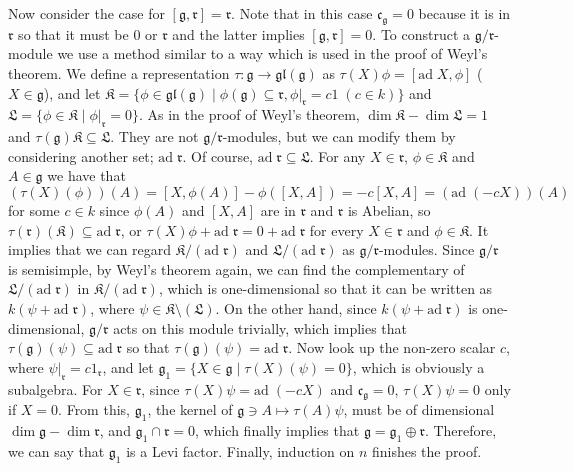 \documentclass{article}
\newcommand{\SBar}{\;|\;}
\newcommand{\lie}[1]{\mathfrak{#1}}
\newcommand{\ad}[1]{\mathrm{ad}\; #1}
\begin{document}
Now consider the case for $[\lie{g}, \lie{r}] = \lie{r}$.
Note that in this case $\lie{c}_\lie{g} = 0$ because it is in $\lie{r}$ so that it must be $0$ or $\lie{r}$ and the latter implies $[\lie{g}, \lie{r}] = 0$.
To construct a $\lie{g}/\lie{r}$-module we use a method similar to a way which is used in the proof of Weyl's theorem.
We define a representation $\tau : \lie{g} \to \lie{gl}(\lie{g})$ as $\tau(X) \phi = [\ad{X}, \phi]$ ($X \in \lie{g}$), and let $\lie{K} = \{\phi \in \lie{gl}(\lie{g}) \SBar \phi(\lie{g}) \subseteq \lie{r}, \phi|_{\lie{r}} = c1 \; (c \in k)\}$ and $\lie{L} = \{\phi \in \lie{K} \SBar \phi|_\lie{r} = 0\}$.
As in the proof of Weyl's theorem, $\dim{\lie{K}} - \dim{\lie{L}} = 1$ and $\tau(\lie{g}) \lie{K} \subseteq \lie{L}$.
They are not $\lie{g}/\lie{r}$-modules, but we can modify them by considering another set; $\ad{\lie{r}}$.
Of course, $\ad{\lie{r}} \subseteq \lie{L}$.
For any $X \in \lie{r}$, $\phi \in \lie{K}$ and $A \in \lie{g}$ we have that $(\tau(X)(\phi))(A) = [X, \phi(A)] - \phi([X, A]) = -c[X, A] = (\ad{(-cX)})(A)$ for some $c \in k$ since $\phi(A)$ and $[X, A]$ are in $\lie{r}$ and $\lie{r}$ is Abelian, so $\tau(\lie{r})(\lie{K}) \subseteq \ad{\lie{r}}$, or $\tau(X)\phi + \ad{\lie{r}} = 0 + \ad{\lie{r}}$ for every $X \in \lie{r}$ and $\phi \in \lie{K}$.
It implies that we can regard $\lie{K}/(\ad{\lie{r}})$ and $\lie{L}/(\ad{\lie{r}})$ as $\lie{g}/\lie{r}$-modules.
Since $\lie{g}/\lie{r}$ is semisimple, by Weyl's theorem again, we can find the complementary of $\lie{L}/(\ad{\lie{r}})$ in $\lie{K}/(\ad{\lie{r}})$, which is one-dimensional so that it can be written as $k(\psi + \ad{\lie{r}})$, where $\psi \in \lie{K} \setminus (\lie{L})$.
On the other hand, since $k(\psi + \ad{\lie{r}})$ is one-dimensional, $\lie{g}/\lie{r}$ acts on this module trivially, which implies that $\tau(\lie{g})(\psi) \subseteq \ad{\lie{r}}$ so that $\tau(\lie{g})(\psi) = \ad{\lie{r}}$.
Now look up the non-zero scalar $c$, where $\psi|_\lie{r} = c1_\lie{r}$, and let $\lie{g}_1 = \{X \in \lie{g} \SBar \tau(X)(\psi) = 0\}$, which is obviously a subalgebra.
For $X \in \lie{r}$, since $\tau(X)\psi = \ad{(-cX)}$ and $\lie{c}_\lie{g} = 0$, $\tau(X)\psi = 0$ only if $X = 0$.
From this, $\lie{g}_1$, the kernel of $\lie{g} \ni A \mapsto \tau(A)\psi$, must be of dimensional $\dim{\lie{g}} - \dim{\lie{r}}$, and $\lie{g}_1 \cap \lie{r} = 0$, which finally implies that $\lie{g} = \lie{g}_1 \oplus \lie{r}$.
Therefore, we can say that $\lie{g}_1$ is a Levi factor.
Finally, induction on $n$ finishes the proof.

\newpage
\end{document}
